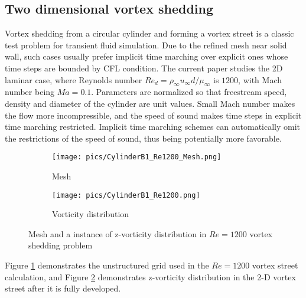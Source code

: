 \subsection{Two dimensional vortex shedding}

Vortex shedding from a circular cylinder and forming a vortex street
is a classic test problem for transient fluid simulation. Due to the refined
mesh near solid wall, such cases usually prefer implicit time marching
over explicit ones whose time steps are bounded by CFL condition.
The current paper studies the 2D laminar case, where
Reynolds number
$Re_d=\rho_\infty u_\infty d / \mu_\infty $ is  $1200$,
with Mach number being $Ma=0.1$.
Parameters are normalized so that freestream speed, density
and diameter of the cylinder are unit values.
Small Mach number makes the flow more incompressible, and
the speed of sound makes time steps in explicit time marching
restricted.
Implicit time marching schemes can automatically omit the restrictions
of the speed of sound, thus being potentially more favorable.

\begin{figure}[htbp]
    \centering
    \begin{subfigure}{0.5\textwidth}
        \texttt{[image: pics/CylinderB1\_Re1200\_Mesh.png]}
        \caption[]{Mesh}
        \label{sfig:CylinderRe1200Demo_Mesh}
    \end{subfigure}\hfill
    \begin{subfigure}{0.5\textwidth}
        \texttt{[image: pics/CylinderB1\_Re1200.png]}
        \caption[]{Vorticity distribution}
        \label{sfig:CylinderRe1200Demo_Vort}
    \end{subfigure}
    \caption[]{Mesh and a instance of z-vorticity distribution
        in $Re=1200$ vortex shedding problem}
    \label{fig:CylinderRe1200Demo}
\end{figure}

Figure \ref{sfig:CylinderRe1200Demo_Mesh} demonstrates
the unstructured grid used in the $Re=1200$  vortex
street calculation, and Figure \ref{sfig:CylinderRe1200Demo_Vort}
demonstrates z-vorticity distribution in the 2-D vortex street
after it is fully developed.

